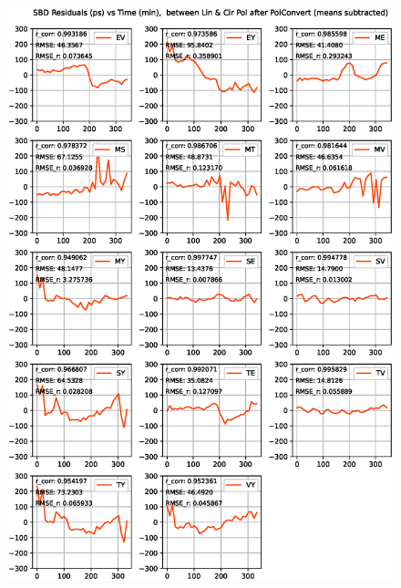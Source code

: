 \documentclass[letterpaper,twoside,12pt]{article}
\begin{document}
\begin{figure}[ht!]
  \begin{center}
  \includegraphics[width=33pc]{SBD_Lin_I_minus_Cir_I.eps}
  \caption{\small }
  \label{sbd_lin_minus_cir}
  \end{center}
\end{figure}
\end{document}
